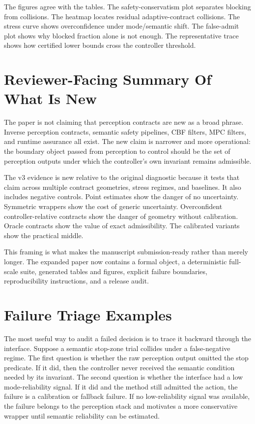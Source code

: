 \documentclass{article}
\begin{document}
The figures agree with the tables. The safety-conservatism plot separates blocking from collisions. The heatmap locates residual adaptive-contract collisions. The stress curve shows overconfidence under mode/semantic shift. The false-admit plot shows why blocked fraction alone is not enough. The representative trace shows how certified lower bounds cross the controller threshold.

\section{Reviewer-Facing Summary Of What Is New}

The paper is not claiming that perception contracts are new as a broad phrase. Inverse perception contracts, semantic safety pipelines, CBF filters, MPC filters, and runtime assurance all exist. The new claim is narrower and more operational: the boundary object passed from perception to control should be the set of perception outputs under which the controller's own invariant remains admissible.

The v3 evidence is new relative to the original diagnostic because it tests that claim across multiple contract geometries, stress regimes, and baselines. It also includes negative controls. Point estimates show the danger of no uncertainty. Symmetric wrappers show the cost of generic uncertainty. Overconfident controller-relative contracts show the danger of geometry without calibration. Oracle contracts show the value of exact admissibility. The calibrated variants show the practical middle.

This framing is what makes the manuscript submission-ready rather than merely longer. The expanded paper now contains a formal object, a deterministic full-scale suite, generated tables and figures, explicit failure boundaries, reproducibility instructions, and a release audit.

\section{Failure Triage Examples}

The most useful way to audit a failed decision is to trace it backward through the interface. Suppose a semantic stop-zone trial collides under a false-negative regime. The first question is whether the raw perception output omitted the stop predicate. If it did, then the controller never received the semantic condition needed by its invariant. The second question is whether the interface had a low mode-reliability signal. If it did and the method still admitted the action, the failure is a calibration or fallback failure. If no low-reliability signal was available, the failure belongs to the perception stack and motivates a more conservative wrapper until semantic reliability can be estimated.
\end{document}
